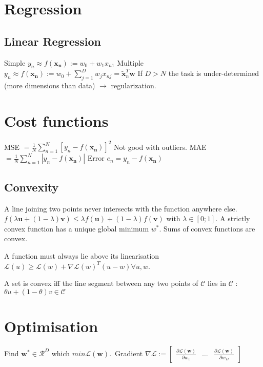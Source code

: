 \section{Regression}
\subsection{Linear Regression}
Simple
$y_n \approx f(\mathbf{x_n}) := w_0 + w_1 x_{n1}$\newline
Multiple
$y_n \approx f(\mathbf{x_n}) := w_0 + \sum_{j=1}^D w_j x_{nj} = \tilde{\mathbf{x}}_n^T \mathbf{w}$
If $D > N$ the task is under-determined (more dimensions than data) $\rightarrow$ regularization.

\section{Cost functions}
MSE $= \frac{1}{N} \sum_{n=1}^N [y_n - f(\mathbf{x_n})]^2$ Not good with outliers.
MAE $= \frac{1}{N} \sum_{n=1}^N |y_n - f(\mathbf{x_n})|$
Error $e_n = y_n - f(\mathbf{x_n})$
\subsection{Convexity}
A line joining two points never intersects with the function anywhere else.
$f(\lambda \mathbf{u} + (1-\lambda)\mathbf{v}) \le \lambda f(\mathbf{u}) + (1-\lambda) f(\mathbf{v})$ with $\lambda \in [0;1]$.
A strictly convex function has a unique global minimum $w^*$. Sums of convex functions are convex.

A function must always lie above its linearisation $\mathcal{L}(u) \ge \mathcal{L}(w) + \nabla \mathcal{L}(w)^T (u-w) \forall u,w$.

A set is convex iff the line segment between any two points of $\mathcal{C}$ lies in $\mathcal{C}$ : $\theta u + (1 - \theta) v \in \mathcal{C}$ 

\section{Optimisation}
Find $\mathbf{w^*} \in \mathcal{R}^D$ which $min \mathcal{L}(\mathbf{w})$.\
Gradient $\nabla \mathcal{L} := \begin{bmatrix} \frac{\partial \mathcal{L}(\mathbf{w})}{\partial w_1} & \dots & \frac{\partial \mathcal{L}(\mathbf{w})}{\partial w_D} \end{bmatrix}$

